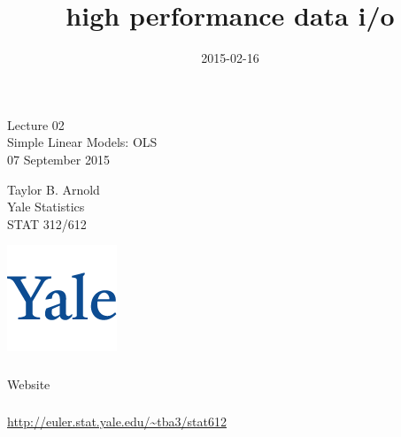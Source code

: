

\title{high performance data i/o}
\date{2015-02-16}



\begin{frame}[fragile] \frametitle{}

\vfill

{\fontsize{0.7cm}{0cm}\selectfont Lecture 02 \\\vspace{0.2cm} Simple Linear Models: OLS}\\\vspace{0.5cm}
07 September 2015

\vspace{2cm}

\begin{minipage}{0.6\textwidth}
Taylor B. Arnold \\
Yale Statistics \\
STAT 312/612
\end{minipage}
\hfill
\begin{minipage}{0.3\textwidth}\raggedleft
\includegraphics[scale=0.3]{../yale-logo.png}
\end{minipage}%

\end{frame}

\begin{frame}[fragile] \frametitle{}

\begin{flushright}
{\color{yaleblue}\sc\fontsize{1cm}{0cm}\selectfont Website}
\end{flushright}

\end{frame}


\begin{frame}[fragile] \frametitle{}

{\fontsize{0.5cm}{0cm}\selectfont
\url{http://euler.stat.yale.edu/~tba3/stat612}
}

\end{frame}

